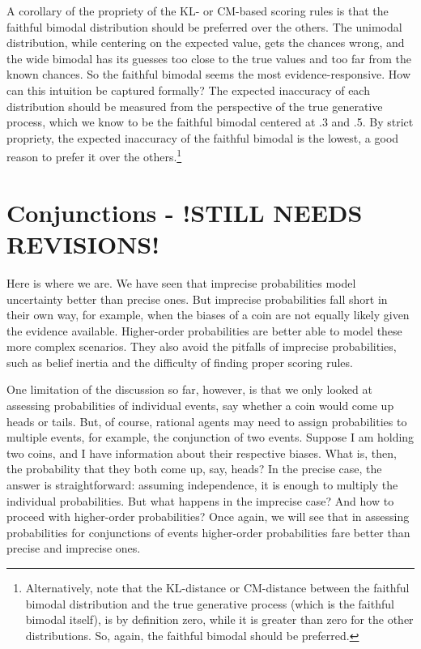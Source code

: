 \documentclass[
  letterpaper,
  DIV=11,
  numbers=noendperiod]{scrartcl}
\begin{document}
A corollary of the propriety of the KL- or CM-based scoring rules is
that the faithful bimodal distribution should be preferred over the
others. The unimodal distribution, while centering on the expected
value, gets the chances wrong, and the wide bimodal has its guesses too
close to the true values and too far from the known chances. So the
faithful bimodal seems the most evidence-responsive. How can this
intuition be captured formally? The expected inaccuracy of each
distribution should be measured from the perspective of the true
generative process, which we know to be the faithful bimodal centered at
.3 and .5. By strict propriety, the expected inaccuracy of the faithful
bimodal is the lowest, a good reason to prefer it over the
others.\footnote{Alternatively, note that the KL-distance or CM-distance
  between the faithful bimodal distribution and the true generative
  process (which is the faithful bimodal itself), is by definition zero,
  while it is greater than zero for the other distributions. So, again,
  the faithful bimodal should be preferred.}

\section{Conjunctions - !STILL NEEDS
REVISIONS!}\label{conjunctions---still-needs-revisions}

\label{sec:higher-order-conjunction}

Here is where we are. We have seen that imprecise probabilities model
uncertainty better than precise ones. But imprecise probabilities fall
short in their own way, for example, when the biases of a coin are not
equally likely given the evidence available. Higher-order probabilities
are better able to model these more complex scenarios. They also avoid
the pitfalls of imprecise probabilities, such as belief inertia and the
difficulty of finding proper scoring rules.

One limitation of the discussion so far, however, is that we only looked
at assessing probabilities of individual events, say whether a coin
would come up heads or tails. But, of course, rational agents may need
to assign probabilities to multiple events, for example, the conjunction
of two events. Suppose I am holding two coins, and I have information
about their respective biases. What is, then, the probability that they
both come up, say, heads? In the precise case, the answer is
straightforward: assuming independence, it is enough to multiply the
individual probabilities. But what happens in the imprecise case? And
how to proceed with higher-order probabilities? Once again, we will see
that in assessing probabilities for conjunctions of events higher-order
probabilities fare better than precise and imprecise ones.
\end{document}
